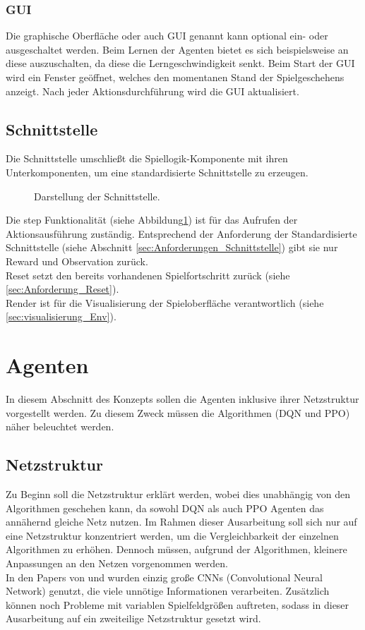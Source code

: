 \subsubsection{GUI} \label{sec:Konzept_GUI}
Die graphische Oberfläche oder auch GUI genannt kann optional ein- oder ausgeschaltet werden. Beim Lernen der Agenten bietet es sich beispielsweise an diese auszuschalten, da diese die Lerngeschwindigkeit senkt. Beim Start der GUI wird ein Fenster geöffnet, welches den momentanen Stand der Spielgeschehens anzeigt. Nach jeder Aktionsdurchführung wird die GUI aktualisiert.

\subsection{Schnittstelle} \label{sec:Konzept_Schnittstelle}
Die Schnittstelle umschließt die Spiellogik-Komponente mit ihren Unterkomponenten, um eine standardisierte Schnittstelle zu erzeugen.
\begin{figure}[H]
	\centering
	\def\svgscale{0.15}
	
	\caption[Schnittstelle]{Darstellung der Schnittstelle.}
	\label{fig:Schnittstelle}
\end{figure}
Die step Funktionalität (siehe Abbildung\ref{fig:Schnittstelle}) ist für das Aufrufen der Aktionsausführung zuständig. Entsprechend der Anforderung der Standardisierte Schnittstelle (siehe Abschnitt \ref{sec:Anforderungen_Schnittstelle}) gibt sie nur Reward und Observation zurück.\\
Reset setzt den bereits vorhandenen Spielfortschritt zurück (siehe \ref{sec:Anforderung_Reset}).\\
Render ist für die Visualisierung der Spieloberfläche verantwortlich (siehe \ref{sec:visualisierung_Env}).

\section{Agenten} \label{sec:Konzept_Agenten}
In diesem Abschnitt des Konzepts sollen die Agenten inklusive ihrer Netzstruktur vorgestellt werden. Zu diesem Zweck müssen die Algorithmen (DQN und PPO) näher beleuchtet werden.

\subsection{Netzstruktur} \label{sec:Konzept_Netzstruktur}
Zu Beginn soll die Netzstruktur erklärt werden, wobei dies unabhängig von den Algorithmen geschehen kann, da sowohl DQN als auch PPO Agenten das annähernd gleiche Netz nutzen.
Im Rahmen dieser Ausarbeitung soll sich nur auf eine Netzstruktur konzentriert werden, um die Vergleichbarkeit der einzelnen Algorithmen zu erhöhen. Dennoch müssen, aufgrund der Algorithmen, kleinere Anpassungen an den Netzen vorgenommen werden.\\
In den Papers von \cite{Autonomous_Agents_in_Snake_Game_via_DRL} und \cite{UAV} wurden einzig große CNNs (Convolutional Neural Network) genutzt, die viele unnötige Informationen verarbeiten. Zusätzlich können noch Probleme mit variablen Spielfeldgrößen auftreten, sodass in dieser Ausarbeitung auf ein zweiteilige Netzstruktur gesetzt wird. 

